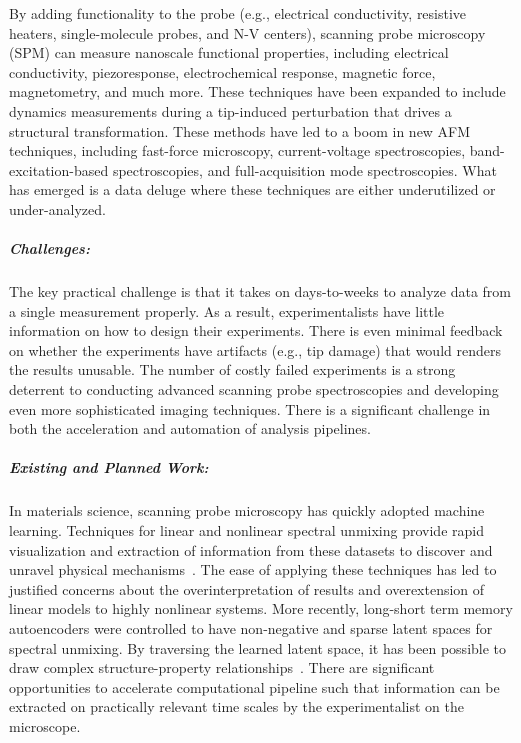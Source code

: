 By adding functionality to the probe (e.g., electrical conductivity\cite{Benstetter2009-oe}, resistive heaters\cite{King2005-sc}, single-molecule probes\cite{Oberhauser2002-cs}, and N-V centers\cite{Ariyaratne2018-hg}), scanning probe microscopy (SPM) can measure nanoscale functional properties, including electrical conductivity\cite{Seidel2010-uv,Gomez-Navarro2005-pu}, piezoresponse\cite{Jesse2011-tv}, electrochemical response\cite{Jesse2012-gh}, magnetic force\cite{Kazakova2019-dj}, magnetometry\cite{Casola2018-ms}, and much more. 
These techniques have been expanded to include dynamics measurements during a tip-induced perturbation that drives a structural transformation. These methods have led to a boom in new AFM techniques, including fast-force microscopy\cite{Benaglia2018-js}, current-voltage spectroscopies\cite{Holstad2020-kq}, band-excitation-based spectroscopies\cite{Jesse2018-jw}, and full-acquisition mode spectroscopies\cite{Somnath2015-qk}. 
What has emerged is a data deluge where these techniques are either underutilized or under-analyzed.

\subparagraph*{Challenges:} The key practical challenge is that it takes on days-to-weeks to analyze data from a single measurement properly. 
As a result, experimentalists have little information on how to design their experiments. 
There is even minimal feedback on whether the experiments have artifacts (e.g., tip damage) that would renders the results unusable. The number of costly failed experiments is a strong deterrent to conducting advanced scanning probe spectroscopies and developing even more sophisticated imaging techniques. 
There is a significant challenge in both the acceleration and automation of analysis pipelines. 

\subparagraph*{Existing and Planned Work:} In materials science, scanning probe microscopy has quickly adopted machine learning. 
Techniques for linear and nonlinear spectral unmixing provide rapid visualization and extraction of information from these datasets to discover and unravel physical mechanisms~\cite{Ziatdinov2020-nt,Collins2020-na,Kalinin2021-gp,Collins2020-ml}. 
The ease of applying these techniques has led to justified concerns about the overinterpretation of results and overextension of linear models\cite{Griffin2020-mc} to highly nonlinear systems. 
More recently, long-short term memory autoencoders were controlled to have non-negative and sparse latent spaces for spectral unmixing. 
By traversing the learned latent space, it has been possible to draw complex structure-property relationships~\cite{Agar2019-eq,Holstad2020-kq}. 
There are significant opportunities to accelerate computational pipeline such that information can be extracted on practically relevant time scales by the experimentalist on the microscope. 

